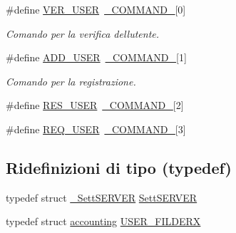 \begin{DoxyCompactItemize}
\#define \mbox{\hyperlink{a00050_a93aba1d96ea1be9898253d4fa67e185e}{V\+E\+R\+\_\+\+U\+S\+ER}}~\mbox{\hyperlink{a00050_ad7ed85b86ff98d7a5853304284acd79e}{\+\_\+\+C\+O\+M\+M\+A\+N\+D\+\_\+}}\mbox{[}0\mbox{]}
\begin{DoxyCompactList}\small\item\em Comando per la verifica dell\textquotesingle{}utente. \end{DoxyCompactList}\item 
\#define \mbox{\hyperlink{a00050_a8b1058dc115af8d4db0d84f2c43a61ca}{A\+D\+D\+\_\+\+U\+S\+ER}}~\mbox{\hyperlink{a00050_ad7ed85b86ff98d7a5853304284acd79e}{\+\_\+\+C\+O\+M\+M\+A\+N\+D\+\_\+}}\mbox{[}1\mbox{]}
\begin{DoxyCompactList}\small\item\em Comando per la registrazione. \end{DoxyCompactList}\item 
\#define \mbox{\hyperlink{a00050_a57d31bf36eb61b82737a881bd3e8a941}{R\+E\+S\+\_\+\+U\+S\+ER}}~\mbox{\hyperlink{a00050_ad7ed85b86ff98d7a5853304284acd79e}{\+\_\+\+C\+O\+M\+M\+A\+N\+D\+\_\+}}\mbox{[}2\mbox{]}
\item 
\#define \mbox{\hyperlink{a00050_a60c7d807af4f8196d078b83ed9c4f45c}{R\+E\+Q\+\_\+\+U\+S\+ER}}~\mbox{\hyperlink{a00050_ad7ed85b86ff98d7a5853304284acd79e}{\+\_\+\+C\+O\+M\+M\+A\+N\+D\+\_\+}}\mbox{[}3\mbox{]}
\end{DoxyCompactItemize}
\subsection*{Ridefinizioni di tipo (typedef)}
\begin{DoxyCompactItemize}
\item 
typedef struct \mbox{\hyperlink{a00068}{\+\_\+\+Sett\+S\+E\+R\+V\+ER}} \mbox{\hyperlink{a00050_a2ae1b7622ac02fc56c93b1f3911fbd76}{Sett\+S\+E\+R\+V\+ER}}
\item 
typedef struct \mbox{\hyperlink{a00072}{accounting}} \mbox{\hyperlink{a00050_a36ac654fad535999242c37c6b7534162}{U\+S\+E\+R\+\_\+\+F\+I\+L\+D\+E\+RX}}
\end{DoxyCompactItemize}
